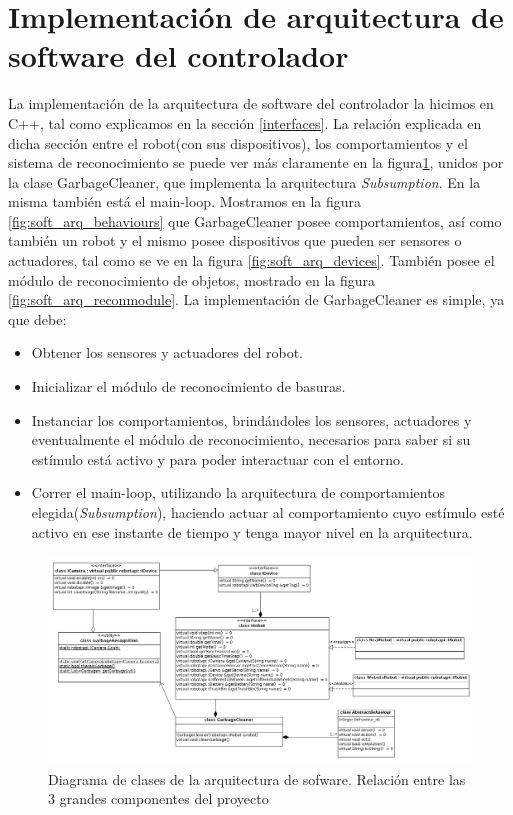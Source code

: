 
\section[Implementaci\'on de arquitectura de software del controlador]
		{Implementaci\'on de arquitectura de software del controlador}
La implementaci\'on de la arquitectura de software del controlador la hicimos en C++, tal
como explicamos en la secci\'on \ref{interfaces}. La relaci\'on explicada en dicha secci\'on
entre el robot(con sus dispositivos), los comportamientos y el sistema de reconocimiento se
puede ver m\'as claramente en la figura\ref{fig:theAllTogether}, unidos por la clase GarbageCleaner,
que implementa la arquitectura \emph{Subsumption}. En la misma tambi\'en est\'a el main-loop. Mostramos
en la figura \ref{fig:soft_arq_behaviours} que GarbageCleaner posee comportamientos, as\'i como tambi\'en
un robot y el mismo posee dispositivos que pueden ser sensores o actuadores, tal como se ve
en la figura \ref{fig:soft_arq_devices}. Tambi\'en posee el m\'odulo de reconocimiento de
objetos, mostrado en la figura \ref{fig:soft_arq_reconmodule}. La implementaci\'on de GarbageCleaner
es simple, ya que debe:
\begin{itemize}
	\item{} Obtener los sensores y actuadores del robot.
	\item{} Inicializar el m\'odulo de reconocimiento de basuras.
	\item{} Instanciar los comportamientos, brind\'andoles los sensores, actuadores y eventualmente
			el m\'odulo de reconocimiento, necesarios para saber si su est\'imulo est\'a activo y
			para poder interactuar con el entorno.
	\item{} Correr el main-loop, utilizando la arquitectura de comportamientos
			elegida(\emph{Subsumption}), haciendo actuar al comportamiento cuyo est\'imulo
			est\'e activo en ese instante de tiempo y tenga mayor nivel en la arquitectura.
\end{itemize}
\begin{landscape}
\begin{figure}[h]
	\centering
	\includegraphics[scale=0.52]{comportamientos/figures/api4.png}
	\caption[Arquitectura de software: principales componentes]{Diagrama de clases de la arquitectura
			de sofware. Relaci\'on entre las 3 grandes componentes del proyecto}
	\label{fig:theAllTogether}
\end{figure}
\end{landscape}

